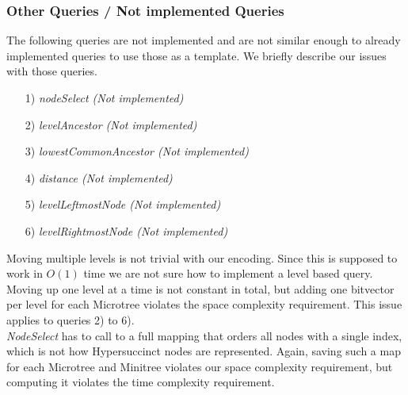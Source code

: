 \documentclass{article}
\begin{document}
\subsubsection{Other Queries / Not implemented Queries} \label{Other Queries / Not implemented Queries}
The following queries are not implemented and are not similar enough to already implemented queries to use those as a template. We briefly describe our issues with those queries.
\begin{itemize}
	\item[1)] \textit{nodeSelect (Not implemented)}
	\item[2)] \textit{levelAncestor (Not implemented)}
	\item[3)] \textit{lowestCommonAncestor (Not implemented)}
	\item[4)] \textit{distance (Not implemented)}
	\item[5)] \textit{levelLeftmostNode (Not implemented)}
	\item[6)] \textit{levelRightmostNode (Not implemented)}
\end{itemize}
Moving multiple levels is not trivial with our encoding. Since this is supposed to work in $O(1)$ time we are not sure how to implement a level based query. Moving up one level at a time is not constant in total, but adding one bitvector per level for each Microtree violates the space complexity requirement. This issue applies to queries 2) to 6).\\
\textit{NodeSelect} has to call to a full mapping that orders all nodes with a single index, which is not how Hypersuccinct nodes are represented. Again, saving such a map for each Microtree and Minitree violates our space complexity requirement, but computing it violates the time complexity requirement.
\end{document}

